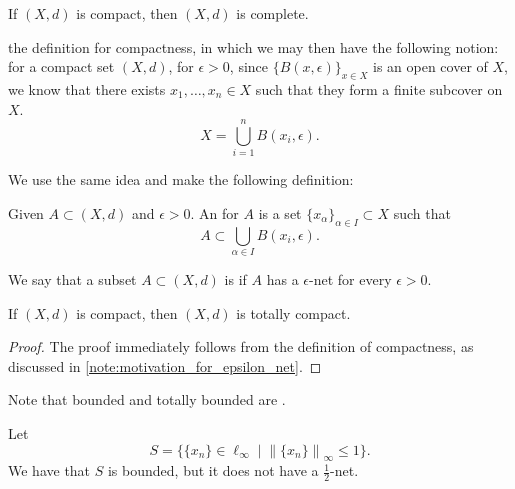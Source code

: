 \documentclass[notoc,notitlepage]{tufte-book}
\newcommand{\norm}[1]{\left\| #1 \right\|}
\begin{document}
\begin{crly}\label{crly:compact_metric_spaces_are_complete}
  If $(X, d)$ is compact, then $(X, d)$ is complete.
\end{crly}

\begin{note}\label{note:motivation_for_epsilon_net}
   the definition for compactness, in which we may then have the following notion: for a compact set $(X, d)$, for $\epsilon > 0$, since $\{ B(x, \epsilon ) \}_{x \in X}$ is an open cover of $X$, we know that there exists $x_1, \ldots, x_n \in X$ such that they form a finite subcover on $X$.
  \begin{equation*}
    X = \bigcup_{i=1}^{n} B(x_i, \epsilon).
  \end{equation*}
\end{note}

We use the same idea and make the following definition:

\begin{defn}\label{defn:_epsilon_net}
  Given $A \subset (X, d)$ and $\epsilon > 0$. An  for $A$ is a set $\{ x_\alpha \}_{\alpha \in I} \subset X$ such that
  \begin{equation*}
    A \subset \bigcup_{\alpha \in I} B(x_i, \epsilon).
  \end{equation*}
\end{defn}

\begin{defn}\label{defn:totally_bounded}
  We say that a subset $A \subset (X, d)$ is  if $A$ has a  $\epsilon$-net for every $\epsilon > 0$.
\end{defn}

\begin{thm}\label{thm:compact_sets_are_totally_bounded}
  If $(X, d)$ is compact, then $(X, d)$ is totally compact.
\end{thm}

\begin{proof}
  The proof immediately follows from the definition of compactness, as discussed in \cref{note:motivation_for_epsilon_net}.
\end{proof}

Note that bounded and totally bounded are .

\begin{eg}
  Let
  \begin{equation*}
    S = \{ \{ x_n \} \in \ell_\infty \mid \norm{ \{ x_n \} }_\infty \leq 1 \}.
  \end{equation*}
  We have that $S$ is bounded, but it does not have a $\frac{1}{2}$-net.
\end{eg}
\end{document}
